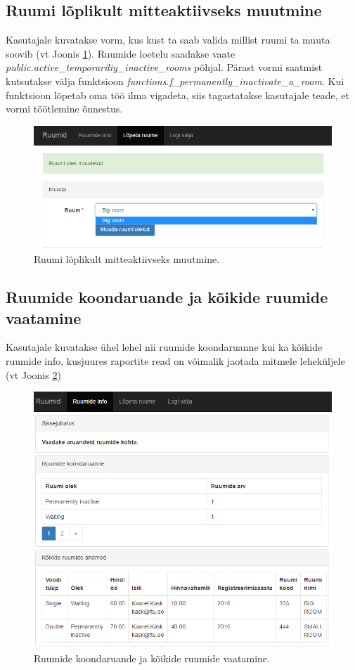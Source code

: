 \documentclass[a4paper,12pt]{article} %
\begin{document}
\subsection{Ruumi lõplikult mitteaktiivseks muutmine}
Kasutajale kuvatakse vorm, kus kust ta saab valida millist ruumi ta muuta soovib (vt Joonis \ref{fig_näidisrakendus_vorm}). Ruumide loetelu saadakse vaate  \textit{public.active\_temporariliy\_inactive\_rooms} põhjal. Pärast vormi saatmist kutsutakse välja funktsioon \textit{functions.f\_permanently\_inactivate\_a\_room}. Kui funktsioon lõpetab oma töö ilma vigadeta, siis tagastatakse kasutajale teade, et vormi töötlemine õnnestus.
\begin{figure}[H]
\centering
\includegraphics[width=\textwidth]{./diagrams/sample-app-form.png}
\caption{Ruumi lõplikult mitteaktiivseks muutmine.}
\label{fig_näidisrakendus_vorm}
\end{figure}
\subsection{Ruumide koondaruande ja kõikide ruumide vaatamine}
Kasutajale kuvatakse ühel lehel nii ruumide koondaruanne kui ka kõikide ruumide info, kusjuures raportite read on võimalik jaotada mitmele leheküljele (vt Joonis \ref{fig_näidisrakendus_raportid})
\begin{figure}[H]
\centering
\includegraphics[width=\textwidth]{./diagrams/sample-app-reports.png}
\caption{Ruumide koondaruande ja kõikide ruumide vaatamine.}
\label{fig_näidisrakendus_raportid}
\end{figure}
\end{document}

